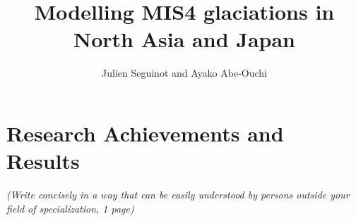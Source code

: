 \documentclass{article}
\title{Modelling MIS4 glaciations in North Asia and Japan}
\author{Julien Seguinot and Ayako Abe-Ouchi}
\begin{document}

\maketitle


\setcounter{section}{15}
\section{Research Achievements and Results}

    \emph{(Write concisely in a way that can be easily understood by persons
          outside your field of specialization, 1 page)}

\end{document}
